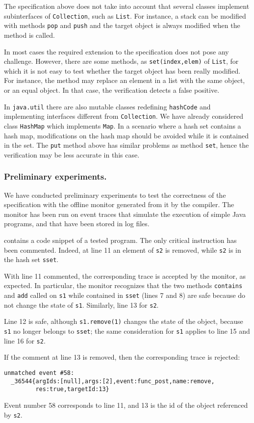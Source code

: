 The specification above does not take into account that several classes implement subinterfaces of \lstinline{Collection}, such as \lstinline{List}.
For instance, a stack can be modified with methods \lstinline{pop} and \lstinline{push} and the target object is always modified when the method is called.

In most cases the required extension to the specification does not pose any challenge. However, there are some methods, as
\lstinline{set(index,elem)} of \lstinline{List}, for which it is not easy to test whether the target object has been really modified.
For instance, the method
may replace an element in a list with the same object, or an equal object. In that case, the verification detects a false positive.

In \lstinline{java.util} there are also mutable classes redefining \lstinline{hashCode} and implementing interfaces different from
\lstinline{Collection}. We have already considered class \lstinline{HashMap} which implements \lstinline{Map}. In a scenario where
a hash set contains a hash map, modifications on the hash map should be avoided while it is contained in the set.
The \lstinline{put} method above has similar problems as method \lstinline{set}, hence the verification may be less accurate in this case.

\subsubsection*{Preliminary experiments.}
We have conducted preliminary experiments to test the correctness of the specification
with the offline monitor generated from it by the \rml compiler.
The monitor has been run on event traces that simulate the  execution of simple Java programs, and that have been stored in log files.

 contains a code snippet of a tested program. The only critical instruction has been commented.
Indeed, at line 11 an element of \lstinline{s2} is removed, while \lstinline{s2} is in the hash set \lstinline{sset}.

With line 11 commented, the corresponding trace is accepted by the monitor, as expected.
In particular, the monitor recognizes that the two methods \lstinline{contains} and \lstinline{add} called on \lstinline{s1}
while contained in \lstinline{sset} (lines 7 and 8) are safe because do not change the state of \lstinline{s1}. Similarly, line 13 for
\lstinline{s2}.

Line 12 is safe, although \lstinline{s1.remove(1)} changes the state of the object, because \lstinline{s1} no longer belongs to
\lstinline{sset}; the same consideration for \lstinline{s1} applies to line 15 and line 16 for \lstinline{s2}. 

If the comment at line 13 is removed, then the corresponding trace is rejected:
\begin{lstlisting}[language={},basicstyle=\ttfamily\scriptsize]
unmatched event #58:
  _36544{argIds:[null],args:[2],event:func_post,name:remove,
         res:true,targetId:13}
\end{lstlisting}
Event number 58 corresponds to line 11, and 13 is the id of the object referenced by \lstinline{s2}.   
